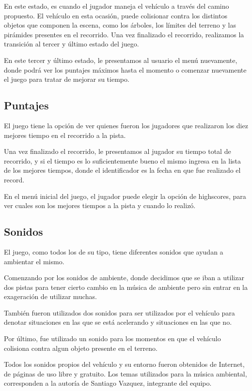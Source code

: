 \documentclass[a4paper,10pt]{article}
\begin{document}
En este estado, es cuando el jugador maneja el veh\'iculo a trav\'es del camino
propuesto.  El veh\'iculo en esta ocasi\'on, puede colisionar contra los
distintos
objetos que componen la escena, como los \'arboles, los l\'imites del terreno y
las
pir\'amides presentes en el recorrido.  Una vez finalizado el recorrido,
realizamos la transici\'on al tercer y \'ultimo estado del juego.

En este tercer y \'ultimo estado, le presentamos al usuario el men\'u
nuevamente,
donde podr\'a ver los puntajes m\'aximos hasta el momento o comenzar nuevamente
el
juego para tratar de mejorar su tiempo.

\subsection{Puntajes}
El juego tiene la opci\'on de ver quienes fueron los jugadores que realizaron
los
diez mejores tiempo en el recorrido a la pista.

Una vez finalizado el recorrido, le presentamos al jugador su tiempo total
de
recorrido, y si el tiempo es lo suficientemente bueno el mismo ingresa en la
lista de los mejores tiempos, donde el identificador es la fecha en que fue
realizado el record.

En el men\'u inicial del juego, el jugador puede elegir la opci\'on de
highscores,
para ver cuales son los mejores tiempos a la pista y cuando lo realiz\'o.


\subsection{Sonidos}
El juego, como todos los de su tipo, tiene diferentes sonidos que ayudan a
ambientar el mismo.

Comenzando por los sonidos de ambiente, donde decidimos que se iban a
utilizar
dos pistas para tener cierto cambio en la m\'usica de ambiente pero sin entrar
en
la exageraci\'on de utilizar muchas.

Tambi\'en fueron utilizados dos sonidos para ser utilizados por el veh\'iculo
para
denotar situaciones en las que se est\'a acelerando y situaciones en las que no.

Por \'ultimo, fue utilizado un sonido para los momentos en que el veh\'iculo
colisiona contra algun objeto presente en el terreno.

Todos los sonidos propios del veh\'iculo y su entorno fueron obtenidos de
Internet, de p\'aginas de uso libre y gratuito.  Los temas utilizados para la
m\'usica ambiental, corresponden a la autor\'ia de Santiago Vazquez, integrante
del
equipo.
\end{document}
